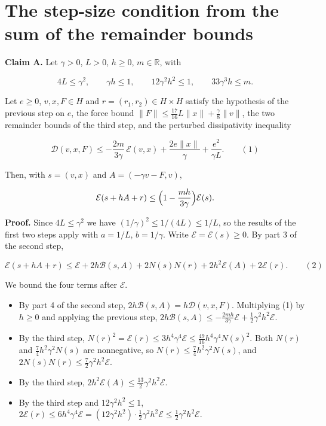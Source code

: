 \documentclass[11pt,a4paper]{article}
\begin{document}
\section{\texorpdfstring{The step-size condition from the sum of the remainder bounds}{The step-size condition from the sum of the remainder bounds}}


\textbf{Claim A.} Let \(\gamma>0\), \(L>0\), \(h\ge0\), \(m\in\mathbb R\), with


\[4L\le\gamma^2,\qquad\gamma h\le1,\qquad12\gamma^2h^2\le1,\qquad33\gamma^3h\le m .\]


Let \(e\ge0\), \(v,x,F\in H\) and \(r=(r_1,r_2)\in H\times H\) satisfy the hypothesis of the previous step on \(e\), the force bound \(\|F\|\le\frac{17}{16}L\|x\|+\frac\gamma8\|v\|\), the two remainder bounds of the third step, and the perturbed dissipativity inequality


\[\mathcal D(v,x,F)\le-\frac{2m}{3\gamma}\,\mathcal E(v,x)+\frac{2e\|x\|}{\gamma}+\frac{e^2}{\gamma L}.\qquad(1)\]


Then, with \(s=(v,x)\) and \(A=(-\gamma v-F,v)\),


\[\mathcal E(s+hA+r)\le\Bigl(1-\frac{mh}{3\gamma}\Bigr)\mathcal E(s).\]


\textbf{Proof.} Since \(4L\le\gamma^2\) we have \((1/\gamma)^2\le1/(4L)\le1/L\), so the results of the first two steps apply with \(a=1/L\), \(b=1/\gamma\). Write \(\mathcal E=\mathcal E(s)\ge0\). By part 3 of the second step,


\[\mathcal E(s+hA+r)\le\mathcal E+2h\mathcal B(s,A)+2N(s)N(r)+2h^2\mathcal E(A)+2\mathcal E(r).\qquad(2)\]


We bound the four terms after \(\mathcal E\).



\begin{itemize}


\item By part 4 of the second step, \(2h\mathcal B(s,A)=h\mathcal D(v,x,F)\). Multiplying (1) by \(h\ge0\) and applying the previous step, \(2h\mathcal B(s,A)\le-\frac{2mh}{3\gamma}\mathcal E+\frac12\gamma^2h^2\mathcal E\).

\item By the third step, \(N(r)^2=\mathcal E(r)\le3h^4\gamma^4\mathcal E\le\frac{49}{16}h^4\gamma^4N(s)^2\). Both \(N(r)\) and \(\frac74h^2\gamma^2N(s)\) are nonnegative, so \(N(r)\le\frac74h^2\gamma^2N(s)\), and \(2N(s)N(r)\le\frac72\gamma^2h^2\mathcal E\).

\item By the third step, \(2h^2\mathcal E(A)\le\frac{13}2\gamma^2h^2\mathcal E\).

\item By the third step and \(12\gamma^2h^2\le1\), \(2\mathcal E(r)\le6h^4\gamma^4\mathcal E=(12\gamma^2h^2)\cdot\frac12\gamma^2h^2\mathcal E\le\frac12\gamma^2h^2\mathcal E\).

\end{itemize}
\end{document}
